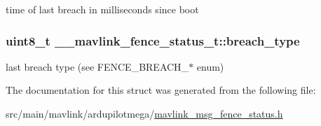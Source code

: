 time of last breach in milliseconds since boot 

\hypertarget{struct____mavlink__fence__status__t_a638d845cdd228e40ef32d988f6235667}{
\subsubsection[{breach\+\_\+type}]{\setlength{\rightskip}{0pt plus 5cm}uint8\+\_\+t \+\_\+\+\_\+mavlink\+\_\+fence\+\_\+status\+\_\+t\+::breach\+\_\+type}}\label{struct____mavlink__fence__status__t_a638d845cdd228e40ef32d988f6235667}


last breach type (see F\+E\+N\+C\+E\+\_\+\+B\+R\+E\+A\+C\+H\+\_\+$\ast$ enum) 



The documentation for this struct was generated from the following file\+:\begin{DoxyCompactItemize}
\item 
src/main/mavlink/ardupilotmega/\hyperlink{mavlink__msg__fence__status_8h}{mavlink\+\_\+msg\+\_\+fence\+\_\+status.\+h}\end{DoxyCompactItemize}
